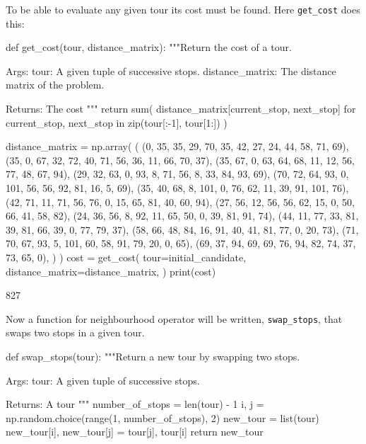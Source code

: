 \begin{pyout}
[0, 7, 12, 5, 11, 3, 9, 2, 8, 10, 4, 1, 6, 0]
\end{pyout}

To be able to evaluate any given tour its cost must be found. Here
\texttt{get_cost} does this:

\begin{pyin}
def get_cost(tour, distance_matrix):
    """Return the cost of a tour.

    Args:
        tour: A given tuple of successive stops.
        distance_matrix: The distance matrix of the problem.

    Returns:
        The cost
    """
    return sum(
        distance_matrix[current_stop, next_stop]
        for current_stop, next_stop in zip(tour[:-1], tour[1:])
    )
\end{pyin}

\begin{pyin}
distance_matrix = np.array(
    (
        (0, 35, 35, 29, 70, 35, 42, 27, 24, 44, 58, 71, 69),
        (35, 0, 67, 32, 72, 40, 71, 56, 36, 11, 66, 70, 37),
        (35, 67, 0, 63, 64, 68, 11, 12, 56, 77, 48, 67, 94),
        (29, 32, 63, 0, 93, 8, 71, 56, 8, 33, 84, 93, 69),
        (70, 72, 64, 93, 0, 101, 56, 56, 92, 81, 16, 5, 69),
        (35, 40, 68, 8, 101, 0, 76, 62, 11, 39, 91, 101, 76),
        (42, 71, 11, 71, 56, 76, 0, 15, 65, 81, 40, 60, 94),
        (27, 56, 12, 56, 56, 62, 15, 0, 50, 66, 41, 58, 82),
        (24, 36, 56, 8, 92, 11, 65, 50, 0, 39, 81, 91, 74),
        (44, 11, 77, 33, 81, 39, 81, 66, 39, 0, 77, 79, 37),
        (58, 66, 48, 84, 16, 91, 40, 41, 81, 77, 0, 20, 73),
        (71, 70, 67, 93, 5, 101, 60, 58, 91, 79, 20, 0, 65),
        (69, 37, 94, 69, 69, 76, 94, 82, 74, 37, 73, 65, 0),
    )
)
cost = get_cost(
    tour=initial_candidate,
    distance_matrix=distance_matrix,
)
print(cost)
\end{pyin}

\begin{pyout}
827
\end{pyout}

Now a function for neighbourhood operator will be written,
\texttt{swap_stops}, that swaps two stops in a given tour.

\begin{pyin}
def swap_stops(tour):
    """Return a new tour by swapping two stops.

    Args:
        tour: A given tuple of successive stops.

    Returns:
        A tour
    """
    number_of_stops = len(tour) - 1
    i, j = np.random.choice(range(1, number_of_stops), 2)
    new_tour = list(tour)
    new_tour[i], new_tour[j] = tour[j], tour[i]
    return new_tour
\end{pyin}

